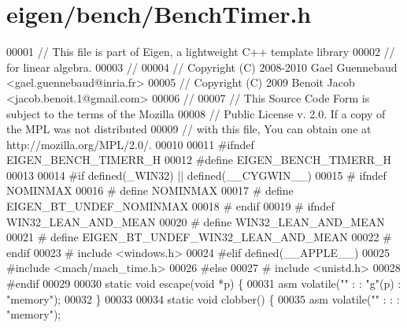 \hypertarget{eigen_2bench_2_bench_timer_8h_source}{}\section{eigen/bench/\+Bench\+Timer.h}
\label{eigen_2bench_2_bench_timer_8h_source}

\begin{DoxyCode}
00001 \textcolor{comment}{// This file is part of Eigen, a lightweight C++ template library}
00002 \textcolor{comment}{// for linear algebra.}
00003 \textcolor{comment}{//}
00004 \textcolor{comment}{// Copyright (C) 2008-2010 Gael Guennebaud <gael.guennebaud@inria.fr>}
00005 \textcolor{comment}{// Copyright (C) 2009 Benoit Jacob <jacob.benoit.1@gmail.com>}
00006 \textcolor{comment}{//}
00007 \textcolor{comment}{// This Source Code Form is subject to the terms of the Mozilla}
00008 \textcolor{comment}{// Public License v. 2.0. If a copy of the MPL was not distributed}
00009 \textcolor{comment}{// with this file, You can obtain one at http://mozilla.org/MPL/2.0/.}
00010 
00011 \textcolor{preprocessor}{#ifndef EIGEN\_BENCH\_TIMERR\_H}
00012 \textcolor{preprocessor}{#define EIGEN\_BENCH\_TIMERR\_H}
00013 
00014 \textcolor{preprocessor}{#if defined(\_WIN32) || defined(\_\_CYGWIN\_\_)}
00015 \textcolor{preprocessor}{# ifndef NOMINMAX}
00016 \textcolor{preprocessor}{#   define NOMINMAX}
00017 \textcolor{preprocessor}{#   define EIGEN\_BT\_UNDEF\_NOMINMAX}
00018 \textcolor{preprocessor}{# endif}
00019 \textcolor{preprocessor}{# ifndef WIN32\_LEAN\_AND\_MEAN}
00020 \textcolor{preprocessor}{#   define WIN32\_LEAN\_AND\_MEAN}
00021 \textcolor{preprocessor}{#   define EIGEN\_BT\_UNDEF\_WIN32\_LEAN\_AND\_MEAN}
00022 \textcolor{preprocessor}{# endif}
00023 \textcolor{preprocessor}{# include <windows.h>}
00024 \textcolor{preprocessor}{#elif defined(\_\_APPLE\_\_)}
00025 \textcolor{preprocessor}{#include <mach/mach\_time.h>}
00026 \textcolor{preprocessor}{#else}
00027 \textcolor{preprocessor}{# include <unistd.h>}
00028 \textcolor{preprocessor}{#endif}
00029 
00030 \textcolor{keyword}{static} \textcolor{keywordtype}{void} escape(\textcolor{keywordtype}{void} *p) \{
00031   \textcolor{keyword}{asm} \textcolor{keyword}{volatile}(\textcolor{stringliteral}{""} : : \textcolor{stringliteral}{"g"}(p) : \textcolor{stringliteral}{"memory"});
00032 \}
00033 
00034 \textcolor{keyword}{static} \textcolor{keywordtype}{void} clobber() \{
00035   \textcolor{keyword}{asm} \textcolor{keyword}{volatile}(\textcolor{stringliteral}{""} : : : \textcolor{stringliteral}{"memory"});

\end{DoxyCode}
